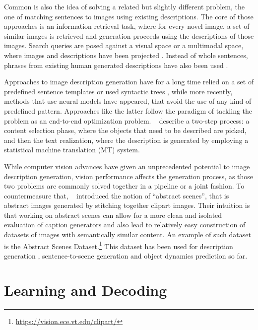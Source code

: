\documentclass[letterpaper]{article}
\newcommand{\newcite}[1]{\citeauthor{#1}~\shortcite{#1}}
\begin{document}
Common is also the idea of solving a related but slightly different problem, the one of matching sentences to images using existing descriptions.
The core of those approaches is an information retrieval task, where for every novel image, a set of similar images is retrieved and generation proceeds 
using the descriptions of those images. Search queries are posed against a visual space \cite{ordonez2011im2text,mason2014nonparametric} or a multimodal space, where 
images and descriptions have been projected \cite{farhadi2010every,hodosh2013framing}. Instead of whole sentences, phrases from existing human generated descriptions 
have also been used \cite{kuznetsova2012collective}.

Approaches to image description generation have for a long time relied on a set of predefined sentence templates 
\cite{kulkarni2011baby,elliott2013image,yang2011corpus} or used syntactic trees \cite{mitchell2012midge}, while more recently, 
methods that use neural models \cite{kiros2014multimodal,vinyals2015show} have appeared, that avoid the use of any kind of predefined pattern. 
Approaches like the latter follow the paradigm of tackling the problem as an end-to-end optimization problem.
\newcite{ortiz2015learning} describe a two-step process: a content selection phase, where the objects that need to 
be described are picked, and then the text realization, where the description is generated 
by employing a statistical machine translation (MT) system.


While computer vision advances have given an unprecedented potential to image description generation, vision performance affects
the generation process, as those two problems are commonly solved together in a pipeline or a joint fashion. 
To countermeasure that, \newcite{zitnick2013bringing} introduced the notion of ``abstract scenes'', that is abstract images generated 
by stitching together clipart images. Their intuition is that working on abstract scenes can allow for a more clean and isolated evaluation
of caption generators and also lead to relatively easy construction of datasets of images with semantically similar content.	
An example of such dataset is the Abstract Scenes Dataset.\footnote{\url{https://vision.ece.vt.edu/clipart/}}
This dataset has been used for description generation \cite{ortiz2015learning}, sentence-to-scene generation \cite{zitnick2013learning} and 
object dynamics prediction \cite{fouhey2014predicting} so far.

\section{Learning and Decoding}
\label{section:cca-infer}
\end{document}
